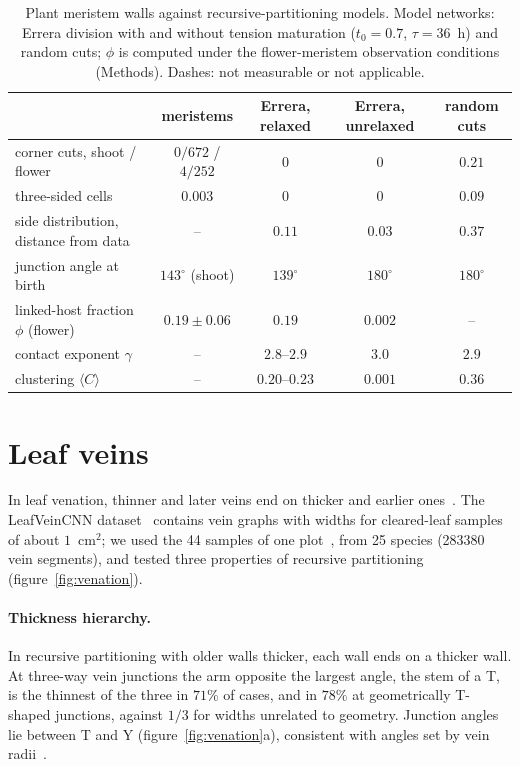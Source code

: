 \documentclass[11pt,a4paper]{article}
\begin{document}
\begin{table}[t]
\centering
\caption{Plant meristem walls against recursive-partitioning models. Model networks: Errera
division with and without tension maturation ($t_0=0.7$, $\tau=36$~h) and random cuts; $\phi$
is computed under the flower-meristem observation conditions (Methods). Dashes: not measurable
or not applicable.}
\label{tab:summary}
\footnotesize
\begin{tabular}{@{}lcccc@{}}
\toprule
 & meristems & Errera, relaxed & Errera, unrelaxed & random cuts\\
\midrule
corner cuts, shoot / flower & $0/672$ / $4/252$ & $0$ & $0$ & $0.21$\\
three-sided cells & $0.003$ & $0$ & $0$ & $0.09$\\
side distribution, distance from data & -- & $0.11$ & $0.03$ & $0.37$\\
junction angle at birth & $143^\circ$ (shoot) & $139^\circ$ & $180^\circ$ & $180^\circ$\\
linked-host fraction $\phi$ (flower) & $0.19\pm0.06$ & $0.19$ & $0.002$ & --\\
contact exponent $\gamma$ & -- & $2.8$--$2.9$ & $3.0$ & $2.9$\\
clustering $\langle C\rangle$ & -- & $0.20$--$0.23$ & $0.001$ & $0.36$\\
\bottomrule
\end{tabular}
\end{table}

\section{Leaf veins}
\label{sec:venation}

In leaf venation, thinner and later veins end on thicker and earlier
ones~\cite{couder2002,bohn2002}. The LeafVeinCNN dataset~\cite{xu2021} contains vein graphs with
widths for cleared-leaf samples of about $1$~cm$^2$; we used the 44 samples of one
plot~\cite{blonder2020}, from 25 species (283380 vein segments), and tested three properties of
recursive partitioning (figure~\ref{fig:venation}).

\paragraph{Thickness hierarchy.} In recursive partitioning with older walls thicker, each wall
ends on a thicker wall. At three-way vein junctions the arm opposite the largest angle, the stem
of a T, is the thinnest of the three in $71\%$ of cases, and in $78\%$ at geometrically T-shaped
junctions, against $1/3$ for widths unrelated to geometry. Junction angles lie between T and Y
(figure~\ref{fig:venation}a), consistent with angles set by vein radii~\cite{bohn2002}.
\end{document}
